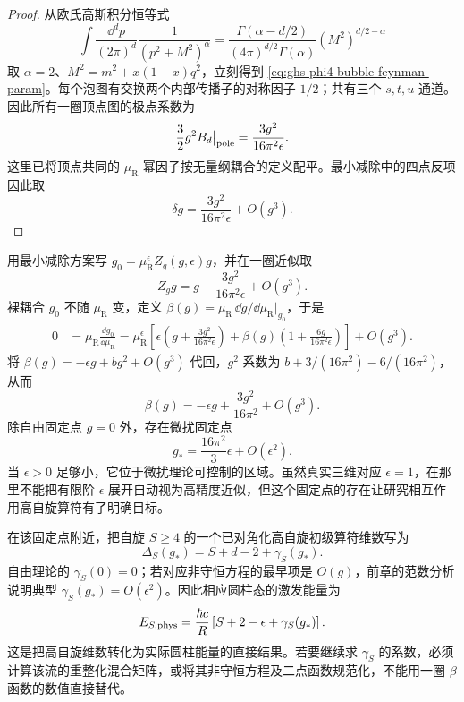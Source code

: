 \begin{proof}
从欧氏高斯积分恒等式
\begin{equation*}
\int\frac{\dd^dp}{(2\pi)^d}\frac1{(p^2+M^2)^\alpha}
=\frac{\Gamma(\alpha-d/2)}{(4\pi)^{d/2}\Gamma(\alpha)}(M^2)^{d/2-\alpha}
\end{equation*}
取 $\alpha=2$、$M^2=m^2+x(1-x)q^2$，立刻得到 \cref{eq:ghs-phi4-bubble-feynman-param}。每个泡图有交换两个内部传播子的对称因子 $1/2$；共有三个 $s,t,u$ 通道。因此所有一圈顶点图的极点系数为
\begin{equation*}
\frac32 g^2 B_d\big|_{\rm pole}
=\frac{3g^2}{16\pi^2\epsilon}.
\end{equation*}
这里已将顶点共同的 $\mu_{\mathrm R}$ 幂因子按无量纲耦合的定义配平。最小减除中的四点反项因此取
\begin{equation*}
\delta g=\frac{3g^2}{16\pi^2\epsilon}+O(g^3).
\end{equation*}
\end{proof}

用最小减除方案写 $g_0=\mu_{\mathrm R}^\epsilon Z_g(g,\epsilon)g$，并在一圈近似取
\begin{equation}\label{eq:ghs-phi4-coupling-renormalization}
 Z_gg=g+\frac{3g^2}{16\pi^2\epsilon}+O(g^3).
\end{equation}
裸耦合 $g_0$ 不随 $\mu_{\mathrm R}$ 变，定义 $\beta(g)=\mu_{\mathrm R}\,\dd g/\dd\mu_{\mathrm R}|_{g_0}$，于是
\begin{align*}
 0&=\mu_{\mathrm R}\frac{\dd g_0}{\dd\mu_{\mathrm R}}
 =\mu_{\mathrm R}^\epsilon\left[
 \epsilon\left(g+\frac{3g^2}{16\pi^2\epsilon}\right)
 +\beta(g)\left(1+\frac{6g}{16\pi^2\epsilon}\right)\right]+O(g^3).
\end{align*}
将 $\beta(g)=-\epsilon g+bg^2+O(g^3)$ 代回，$g^2$ 系数为 $b+3/(16\pi^2)-6/(16\pi^2)$，从而
\begin{equation}\label{eq:ghs-phi4-beta-function}
 \beta(g)=-\epsilon g+\frac{3g^2}{16\pi^2}+O(g^3).
\end{equation}
除自由固定点 $g=0$ 外，存在微扰固定点
\begin{equation}\label{eq:ghs-wilson-fisher-fixed-point}
 g_*=\frac{16\pi^2}{3}\epsilon+O(\epsilon^2).
\end{equation}
当 $\epsilon>0$ 足够小，它位于微扰理论可控制的区域。虽然真实三维对应 $\epsilon=1$，在那里不能把有限阶 $\epsilon$ 展开自动视为高精度近似，但这个固定点的存在让研究相互作用高自旋算符有了明确目标。


在该固定点附近，把自旋 $S\ge4$ 的一个已对角化高自旋初级算符维数写为
\begin{equation}\label{eq:ghs-wf-current-dimension}
 \Delta_S(g_*)=S+d-2+\gamma_S(g_*).
\end{equation}
自由理论的 $\gamma_S(0)=0$；若对应非守恒方程的最早项是 $O(g)$，前章的范数分析说明典型 $\gamma_S(g_*)=O(\epsilon^2)$。因此相应圆柱态的激发能量为
\begin{equation}\label{eq:ghs-wf-cylinder-energy}
 E_{S,\rm phys}=
 \frac{\hbar c}{R}\left[S+2-\epsilon+\gamma_S(g_*)\right].
\end{equation}
这是把高自旋维数转化为实际圆柱能量的直接结果。若要继续求 $\gamma_S$ 的系数，必须计算该流的重整化混合矩阵，或将其非守恒方程及二点函数规范化，不能用一圈 $\beta$ 函数的数值直接替代。

